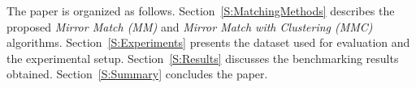\documentclass[conference]{IEEEtran}
\begin{document}
%
%

The paper is organized as follows.  Section~\ref{S:MatchingMethods} describes the proposed \emph{Mirror Match (MM)} and \emph{Mirror Match with Clustering (MMC)} algorithms.  Section~\ref{S:Experiments} presents the dataset used for evaluation and the experimental setup.  Section~\ref{S:Results} discusses the benchmarking results obtained.  Section~\ref{S:Summary} concludes the paper.  
\end{document}
